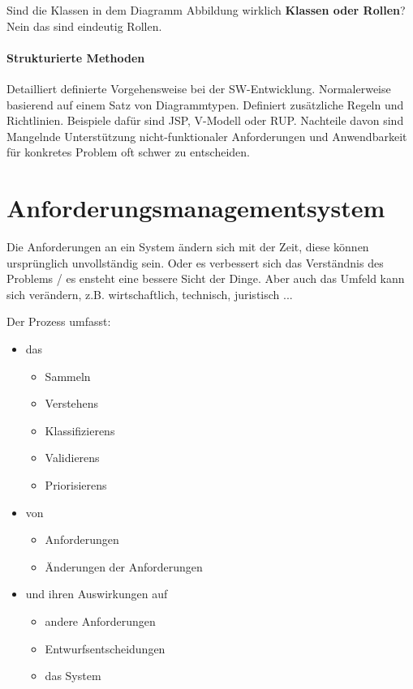 
Sind die Klassen in dem Diagramm Abbildung  wirklich \textbf{Klassen oder Rollen}? Nein das sind eindeutig Rollen.

\newpage
\paragraph{Strukturierte Methoden}
Detailliert definierte Vorgehensweise bei der SW-Entwicklung. Normalerweise basierend auf einem Satz von Diagrammtypen. Definiert zusätzliche Regeln und Richtlinien. Beispiele dafür sind JSP, V-Modell oder RUP. Nachteile davon sind Mangelnde Unterstützung nicht-funktionaler Anforderungen und Anwendbarkeit für konkretes Problem oft schwer zu entscheiden.


\section{Anforderungsmanagementsystem}
Die Anforderungen an ein System ändern sich mit der Zeit, diese können ursprünglich unvollständig sein. Oder es verbessert sich das Verständnis des Problems / es ensteht eine bessere Sicht der Dinge. Aber auch das Umfeld kann sich verändern, z.B. wirtschaftlich, technisch, juristisch ...

Der Prozess umfasst:

\begin{itemize}
\item {
das
\begin{itemize}
\item Sammeln 
\item Verstehens 
\item Klassifizierens 
\item Validierens 
\item Priorisierens
\end{itemize}
}
\item {
von
\begin{itemize}
\item Anforderungen 
\item Änderungen der Anforderungen 
\end{itemize}
}
\item {
und ihren Auswirkungen auf 
\begin{itemize}
\item andere Anforderungen 
\item Entwurfsentscheidungen
\item das System
\end{itemize}
}
\end{itemize}


